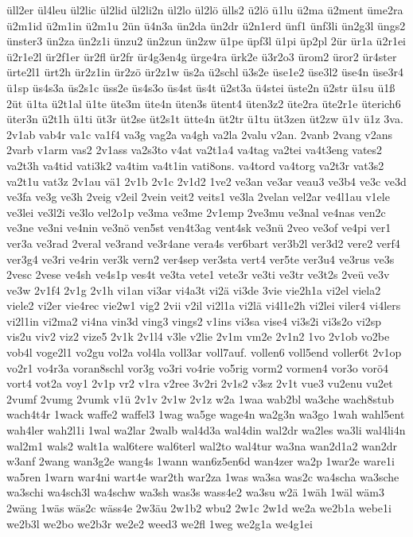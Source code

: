 {üll2er
ül4leu
ül2lic
ül2lid
ül2li2n
ül2lo
ül2lö
ülls2
ü2lö
ü1lu
ü2ma
ü2ment
üme2ra
ü2m1id
ü2m1in
ü2m1u
2ün
ü4n3a
ün2da
ün2dr
ü2n1erd
ünf1
ünf3li
ün2g3l
üngs2
ünster3
ün2za
ün2z1i
ünzu2
ün2zun
ün2zw
ü1pe
üpf3l
ü1pi
üp2pl
2ür
ür1a
ü2r1ei
ü2r1e2l
ür2f1er
ür2fl
ür2fr
ür4g3en4g
ürge4ra
ürk2e
ü3r2o3
ürom2
üror2
ür4ster
ürte2l1
ürt2h
ür2z1in
ür2zö
ür2z1w
üs2a
ü2schl
ü3s2e
üse1e2
üse3l2
üse4n
üse3r4
ü1sp
üs4s3a
üs2s1c
üss2e
üs4s3o
üs4st
üs4t
ü2st3a
ü4stei
üste2n
ü2str
ü1su
ü1ß
2üt
ü1ta
ü2t1al
ü1te
üte3m
üte4n
üten3s
ütent4
üten3z2
üte2ra
üte2r1e
üterich6
üter3n
ü2t1h
ü1ti
üt3r
üt2se
üt2s1t
ütte4n
üt2tr
ü1tu
üt3zen
üt2zw
ü1v
ü1z
3va.
2v1ab
vab4r
va1c
va1f4
va3g
vag2a
va4gh
va2la
2valu
v2an.
2vanb
2vang
v2ans
2varb
v1arm
vas2
2v1ass
va2s3to
v4at
va2t1a4
va4tag
va2tei
va4t3eng
vates2
va2t3h
va4tid
vati3k2
va4tim
va4t1in
vati8ons.
va4tord
va4torg
va2t3r
vat3s2
va2t1u
vat3z
2v1au
vä1
2v1b
2v1c
2v1d2
1ve2
ve3an
ve3ar
veau3
ve3b4
ve3c
ve3d
ve3fa
ve3g
ve3h
2veig
v2eil
2vein
veit2
veits1
ve3la
2velan
vel2ar
ve4l1au
v1ele
ve3lei
ve3l2i
ve3lo
vel2o1p
ve3ma
ve3me
2v1emp
2ve3mu
ve3nal
ve4nas
ven2c
ve3ne
ve3ni
ve4nin
ve3nö
ven5st
ven4t3ag
vent4sk
ve3nü
2veo
ve3of
ve4pi
ver1
ver3a
ve3rad
2veral
ve3rand
ve3r4ane
vera4s
ver6bart
ver3b2l
ver3d2
vere2
verf4
ver3g4
ve3ri
ve4rin
ver3k
vern2
ver4sep
ver3sta
vert4
ver5te
ver3u4
ve3rus
ve3s
2vesc
2vese
ve4sh
ve4s1p
ves4t
ve3ta
vete1
vete3r
ve3ti
ve3tr
ve3t2s
2veü
ve3v
ve3w
2v1f4
2v1g
2v1h
vi1an
vi3ar
vi4a3t
vi2ä
vi3de
3vie
vie2h1a
vi2el
viela2
viele2
vi2er
vie4rec
vie2w1
vig2
2vii
v2il
vi2l1a
vi2lä
vi4l1e2h
vi2lei
viler4
vi4lers
vi2l1in
vi2ma2
vi4na
vin3d
ving3
vings2
v1ins
vi3sa
vise4
vi3s2i
vi3s2o
vi2sp
vis2u
viv2
viz2
vize5
2v1k
2v1l4
v3le
v2lie
2v1m
vm2e
2v1n2
1vo
2v1ob
vo2be
vob4l
voge2l1
vo2gu
vol2a
vol4la
voll3ar
voll7auf.
vollen6
voll5end
voller6t
2v1op
vo2r1
vo4r3a
voran8schl
vor3g
vo3ri
vo4rie
vo5rig
vorm2
vormen4
vor3o
vorö4
vort4
vot2a
voy1
2v1p
vr2
v1ra
v2ree
3v2ri
2v1s2
v3sz
2v1t
vue3
vu2enu
vu2et
2vumf
2vumg
2vumk
v1ü
2v1v
2v1w
2v1z
w2a
1waa
wab2bl
wa3che
wach8stub
wach4t4r
1wack
waffe2
waffel3
1wag
wa5ge
wage4n
wa2g3n
wa3go
1wah
wahl5ent
wah4ler
wah2l1i
1wal
wa2lar
2walb
wal4d3a
wal4din
wal2dr
wa2les
wa3li
wal4li4n
wal2m1
wals2
walt1a
wal6tere
wal6terl
wal2to
wal4tur
wa3na
wan2d1a2
wan2dr
w3anf
2wang
wan3g2e
wang4s
1wann
wan6z5en6d
wan4zer
wa2p
1war2e
ware1i
wa5ren
1warn
war4ni
wart4e
war2th
war2za
1was
wa3sa
was2c
wa4scha
wa3sche
wa3schi
wa4sch3l
wa4schw
wa3sh
was3s
wass4e2
wa3su
w2ä
1wäh
1wäl
wäm3
2wäng
1wäs
wäs2c
wäss4e
2w3äu
2w1b2
wbu2
2w1c
2w1d
we2a
we2b1a
webe1i
we2b3l
we2bo
we2b3r
we2e2
weed3
we2fl
1weg
we2g1a
we4g1ei
}
